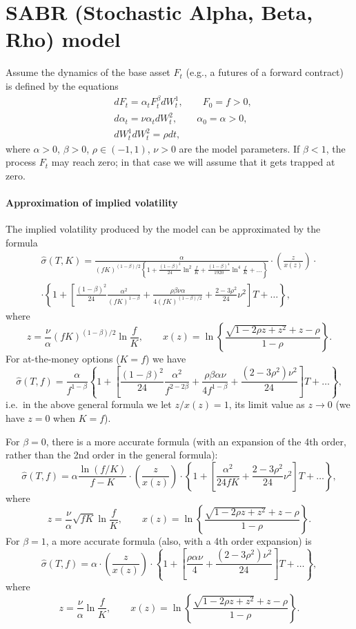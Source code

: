 \documentclass[a4paper,11pt,titlepage]{article}
\renewcommand{\hat}{\widehat}
\theoremstyle{remark}
\begin{document}
\section{SABR (Stochastic Alpha, Beta, Rho) model}
Assume the dynamics of the base asset $F_t$ (e.g., a futures of a forward
contract) is defined by the equations
\begin{align*}
&dF_t          = \alpha_t F_t^\beta dW_t^1, \qquad F_0 = f > 0,\\
&d\alpha_t     = \nu\alpha_t dW_t^2,        \qquad \alpha_0 = \alpha > 0,\\
&dW_t^1 dW_t^2 = \rho dt,
\end{align*}
where $\alpha>0$, $\beta>0$, $\rho\in(-1,1)$, $\nu > 0$ are the model
parameters. If $\beta <1$, the process $F_t$ may reach zero; in that case we
will assume that it gets trapped at zero.

\paragraph{Approximation of implied volatility \citep{Hagan+02}} 
The implied volatility produced by the model can be approximated by the formula
\begin{multline*}
\hat\sigma(T,K) = 
  \frac{\alpha}
    {(fK)^{(1-\beta)/2} 
      \left\{ 1+\frac{(1-\beta)^2}{24} \ln^2 \frac fK 
        + \frac{(1-\beta)^4}{1920} \ln^4 \frac fK + \ldots
      \right\}} 
   \cdot \left( \frac{z}{x(z)}\right) \cdot\\
   \cdot \left\{ 
     1 + \left[
       \frac{(1-\beta)^2}{24} \frac{\alpha^2}{(fK)^{1-\beta}} 
       + \frac{\rho\beta\nu\alpha}{4(fK)^{(1-\beta)/2}} 
       + \frac{2-3\rho^2}{24} \nu^2 
     \right] T 
     + \ldots 
   \right\},
\end{multline*}
where
\[
z = \frac\nu\alpha (fK)^{(1-\beta)/2} \ln \frac fK, \qquad 
x(z) = \ln\left\{ \frac{\sqrt{1-2\rho z + z^2} + z - \rho}{1-\rho} \right\}.
\]
For at-the-money options ($K=f$) we have
\[
\hat\sigma(T,f) = \frac{\alpha}{f^{1-\beta}} 
\left\{1 + 
  \left[ \frac{(1-\beta)^2}{24} \frac{\alpha^2}{f^{2-2\beta}} 
    + \frac{\rho\beta\alpha\nu}{4f^{1-\beta}} 
    + \frac{(2-3\rho^2)\nu^2}{24}
  \right] T 
  + \ldots
\right\},
\]
i.e.\ in the above general formula we let $z/x(z)=1$, its limit value as $z\to
0$ (we have $z=0$ when $K=f$).

For $\beta=0$, there is a more accurate formula (with an expansion of the 4th
order, rather than the 2nd order in the general formula):
\[
\hat\sigma(T,f) = \alpha\frac{\ln(f/K)}{f-K}
\cdot \left( \frac{z}{x(z)} \right)
\cdot \left\{ 1 + 
  \left[ \frac{\alpha^2}{24fK} + \frac{2-3\rho^2}{24}\nu^2 \right] T 
  + \ldots
\right\},
\]
where
\[
z = \frac\nu\alpha\sqrt{fK} \ln \frac{f}{K}, \qquad 
x(z) = \ln\left\{ \frac{\sqrt{1-2\rho z + z^2} + z - \rho}{1 - \rho} \right\}.
\]
For $\beta=1$, a more accurate formula (also, with a 4th order expansion) is
\[
\hat\sigma(T,f) = \alpha \cdot \left( \frac{z}{x(z)} \right)
\cdot \left\{ 1 + 
  \left[\frac{\rho\alpha\nu}{4} + \frac{(2-3\rho^2)\nu^2}{24} \right] T
  + \ldots
\right\},
\]
where
\[
z = \frac\nu\alpha \ln \frac{f}{K}, \qquad 
x(z) = \ln\left\{ \frac{\sqrt{1-2\rho z + z^2} + z - \rho}{1 - \rho}\right\}.
\]
\end{document}
